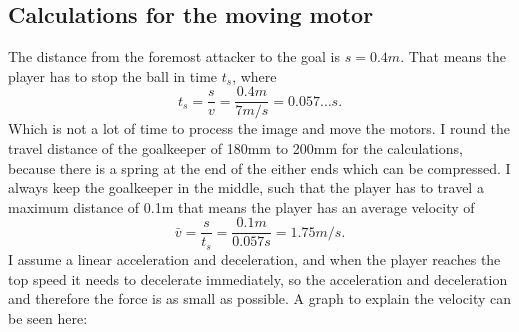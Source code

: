 \subsection{Calculations for the moving motor}\label{subsec:moving_motor}
The distance from the foremost attacker to the goal is $s=0.4m$.
That means the player has to stop the ball in time $t_s$, where
\begin{equation}
    \label{eq:stopping_time}
    t_s = \frac{s}{v} = \frac{0.4m}{7m/s} = 0.057\dots s.
\end{equation}
Which is not a lot of time to process the image and move the motors.
I round the travel distance of the goalkeeper of 180mm to 200mm for the calculations, because there is a spring at the end of the either ends which can be compressed.
I always keep the goalkeeper in the middle, such that the player has to travel a maximum distance of 0.1m that means the player has an average velocity of
\begin{equation}
    \label{eq:average_velocity}
    \bar{v} = \frac{s}{t_s} = \frac{0.1m}{0.057s} = 1.75m/s.
\end{equation}
I assume a linear acceleration and deceleration, and when the player reaches the top speed it needs to decelerate immediately, so the acceleration and deceleration and therefore the force is as small as possible.
A graph to explain the velocity can be seen here:

\begin{center}
\end{center}

